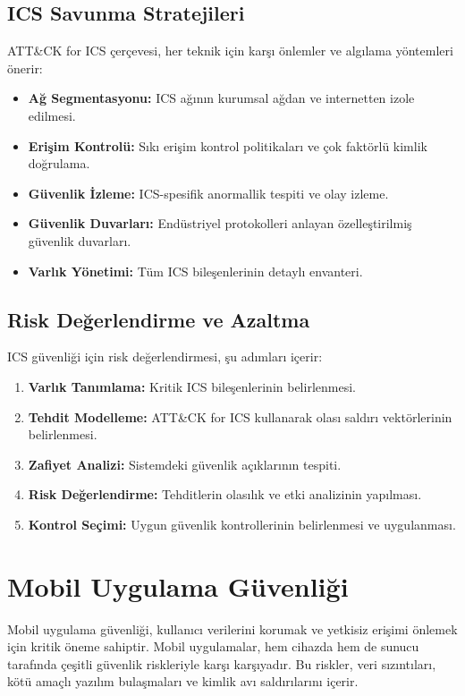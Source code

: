 \subsection{ICS Savunma Stratejileri}

ATT\&CK for ICS çerçevesi, her teknik için karşı önlemler ve algılama yöntemleri önerir:

\begin{itemize}
\item \textbf{Ağ Segmentasyonu:} ICS ağının kurumsal ağdan ve internetten izole edilmesi.
\item \textbf{Erişim Kontrolü:} Sıkı erişim kontrol politikaları ve çok faktörlü kimlik doğrulama.
\item \textbf{Güvenlik İzleme:} ICS-spesifik anormallik tespiti ve olay izleme.
\item \textbf{Güvenlik Duvarları:} Endüstriyel protokolleri anlayan özelleştirilmiş güvenlik duvarları.
\item \textbf{Varlık Yönetimi:} Tüm ICS bileşenlerinin detaylı envanteri.
\end{itemize}

\subsection{Risk Değerlendirme ve Azaltma}

ICS güvenliği için risk değerlendirmesi, şu adımları içerir:

\begin{enumerate}
\item \textbf{Varlık Tanımlama:} Kritik ICS bileşenlerinin belirlenmesi.
\item \textbf{Tehdit Modelleme:} ATT\&CK for ICS kullanarak olası saldırı vektörlerinin belirlenmesi.
\item \textbf{Zafiyet Analizi:} Sistemdeki güvenlik açıklarının tespiti.
\item \textbf{Risk Değerlendirme:} Tehditlerin olasılık ve etki analizinin yapılması.
\item \textbf{Kontrol Seçimi:} Uygun güvenlik kontrollerinin belirlenmesi ve uygulanması.
\end{enumerate}

\section{Mobil Uygulama Güvenliği}

Mobil uygulama güvenliği, kullanıcı verilerini korumak ve yetkisiz erişimi önlemek için kritik öneme sahiptir. Mobil uygulamalar, hem cihazda hem de sunucu tarafında çeşitli güvenlik riskleriyle karşı karşıyadır. Bu riskler, veri sızıntıları, kötü amaçlı yazılım bulaşmaları ve kimlik avı saldırılarını içerir.

